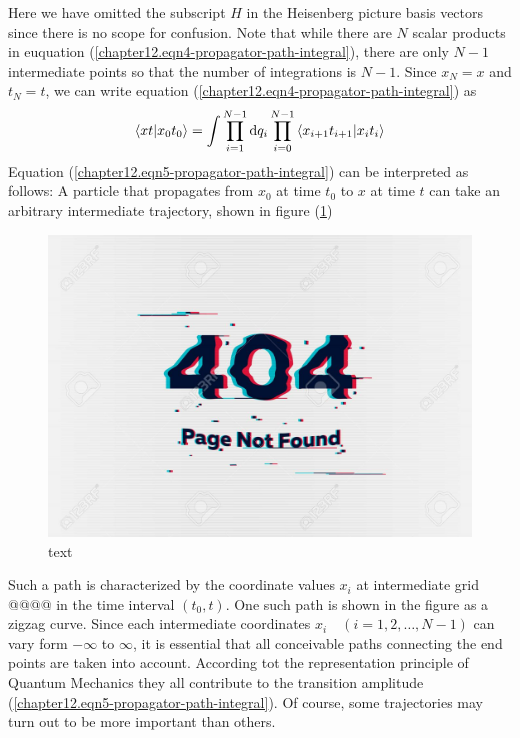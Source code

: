 		Here we have omitted the subscript $H$ in the Heisenberg picture basis vectors since there is no scope for confusion. Note that while there are $N$ scalar products in euquation (\ref{chapter12.eqn4-propagator-path-integral}), there are only $N-1$ intermediate points so that the number of integrations is $N-1$. Since $x_N = x$ and $t_N= t$, we can write equation (\ref{chapter12.eqn4-propagator-path-integral}) as
		\begin{equation}
			\braket{x t}{x_0 t_0} = \int \prod_{i=1}^{N-1} \dd{q_i} \prod_{i=0}^{N-1} \braket{x_{i+1} t_{i+1}}{x_i t_i}
			\label{chapter12.eqn5-propagator-path-integral}
		\end{equation}
		Equation (\ref{chapter12.eqn5-propagator-path-integral}) can be interpreted as follows: A particle that propagates from $x_0$ at time $t_0$ to $x$ at time $t$ can take an arbitrary intermediate trajectory, shown in figure (\ref{chapter12.fig1-propagator-path-integral-trajectory})
		\begin{figure}
			\centering
			\includegraphics[width=0.5\linewidth]{Pictures/not-found.jpg}
			\caption{text}
			\label{chapter12.fig1-propagator-path-integral-trajectory}
		\end{figure}
	Such a path is characterized by the coordinate values $x_i$ at intermediate grid @@@@ in the time interval $(t_0,t)$. One such path is shown in the figure as a zigzag curve. Since each intermediate coordinates $x_i\quad (i=1,2,\ldots,N-1)$ can vary form $-\infty$ to $\infty$, it is essential that all conceivable paths connecting the end points are taken into account. According tot the representation principle of Quantum Mechanics they all contribute to the transition amplitude (\ref{chapter12.eqn5-propagator-path-integral}). Of course, some trajectories may turn out to be more important than others.\\
	
